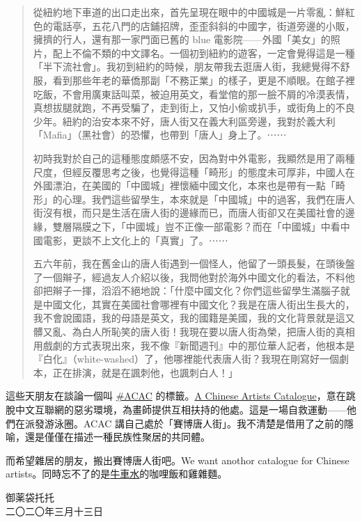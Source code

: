 \documentclass[10pt]{article}
\begin{document}
\begin{quote}
從紐約地下車道的出口走出來，首先呈現在眼中的中國城是一片零亂：鮮紅色的電話亭，五花八門的店鋪招牌，歪歪斜斜的中國字，街道旁邊的小販，擁擠的行人，還有那一家門面已舊的
blue
電影院{——}外國「美女」的照片，配上不倫不類的中文譯名。一個初到紐約的遊客，一定會覺得這是一種「半下流社會」。我初到紐約的時候，朋友帶我去逛唐人街，我總覺得不舒服，看到那些年老的華僑那副「不務正業」的樣子，更是不順眼。在館子裡吃飯，不會用廣東話叫菜，被迫用英文，看堂倌的那一臉不屑的冷漠表情，真想拔腿就跑，不再受騙了，走到街上，又怕小偷或扒手，或街角上的不良少年。紐約的治安本來不好，唐人街又在義大利區旁邊，我對於義大利「Ma­fia」（黑社會）的恐懼，也帶到「唐人」身上了。⋯⋯

初時我對於自己的這種態度頗感不安，因為對中外電影，我顯然是用了兩種尺度，但經反覆思考之後，也覺得這種「畸形」的態度未可厚非，中國人在外國漂泊，在美國的「中國城」裡懷緬中國文化，本來也是帶有一點「畸形」的心理。我們這些留學生，本來就是「中國城」中的過客，我們在唐人街沒有根，而只是生活在唐人街的邊緣而已，而唐人街卻又在美國社會的邊緣，雙層隔膜之下，「中國城」豈不正像一部電影？而在「中國城」中看中國電影，更談不上文化上的「真實」了。⋯⋯

五六年前，我在舊金山的唐人街遇到一個怪人，他留了一頭長髮，在頭後盤了一個辮子，經過友人介紹以後，我問他對於海外中國文化的看法，不料他卻把辮子一揮，滔滔不絕地說：「什麼中國文化？你們這些留學生滿腦子就是中國文化，其實在美國社會哪裡有中國文化？我是在唐人街出生長大的，我不會說國語，我的母語是英文，我的國籍是美國，我的文化背景就是這又髒又亂、為白人所恥笑的唐人街！我現在要以唐人街為榮，把唐人街的真相用戲劇的方式表現出來，我不像『新聞週刊』中的那位華人記者，他根本是『白化』（white-washed）了，他哪裡能代表唐人街？我現在剛寫好一個劇本，正在排演，就是在諷刺他，也諷刺白人！」
\end{quote}

這些天朋友在談論一個叫 \href{https://twitter.com/hashtag/ACAC}{\#ACAC}
的標籤。\href{https://twitter.com/ACACsince5859}{A Chi­nese Art­ists
Cat­a­logue}，意在跳脫中文互聯網的惡劣環境，為畫師提供互相扶持的他處。這是一場自救運動{——}他們在派發游泳圈。ACAC
講自己處於「賽博唐人街」。我不清楚是借用了之前的隱喻，還是僅僅在描述一種民族性聚居的共同體。

而希望雜居的朋友，搬出賽博唐人街吧。We want an­oth­or cat­a­logue for
Chi­nese
artists。同時忘不了的是\href{https://zh.wikipedia.org/wiki/\%E7\%89\%9B\%E8\%BB\%8A\%E6\%B0\%B4}{牛車水}的咖哩飯和雞雜麵。

\vspace{3em}
\begin{flushleft}
\small{御薬袋托托\\
二〇二〇年三月十三日}
\end{flushleft}
\end{document}
